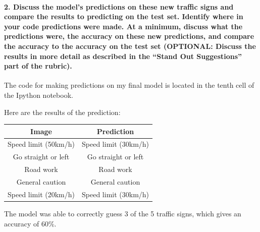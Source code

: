 \documentclass[11pt]{article}
\begin{document}
\paragraph{\texorpdfstring{2. Discuss the model's predictions on these
new traffic signs and compare the results to predicting on the test set.
Identify where in your code predictions were made. At a minimum, discuss
what the predictions were, the accuracy on these new predictions, and
compare the accuracy to the accuracy on the test set (OPTIONAL: Discuss
the results in more detail as described in the ``Stand Out Suggestions''
part of the
rubric).}{2. Discuss the model's predictions on these new traffic signs and compare the results to predicting on the test set. Identify where in your code predictions were made. At a minimum, discuss what the predictions were, the accuracy on these new predictions, and compare the accuracy to the accuracy on the test set (OPTIONAL: Discuss the results in more detail as described in the Stand Out Suggestions part of the rubric).}}\label{discuss-the-models-predictions-on-these-new-traffic-signs-and-compare-the-results-to-predicting-on-the-test-set.-identify-where-in-your-code-predictions-were-made.-at-a-minimum-discuss-what-the-predictions-were-the-accuracy-on-these-new-predictions-and-compare-the-accuracy-to-the-accuracy-on-the-test-set-optional-discuss-the-results-in-more-detail-as-described-in-the-stand-out-suggestions-part-of-the-rubric.}

The code for making predictions on my final model is located in the
tenth cell of the Ipython notebook.

Here are the results of the prediction:

\begin{longtable}[]{@{}cc@{}}
\toprule
Image & Prediction\tabularnewline
\midrule
\endhead
Speed limit (50km/h) & Speed limit (30km/h)\tabularnewline
Go straight or left & Go straight or left\tabularnewline
Road work & Road work\tabularnewline
General caution & General caution\tabularnewline
Speed limit (20km/h) & Speed limit (30km/h)\tabularnewline
\bottomrule
\end{longtable}

The model was able to correctly guess 3 of the 5 traffic signs, which
gives an accuracy of 60\%.
\end{document}
